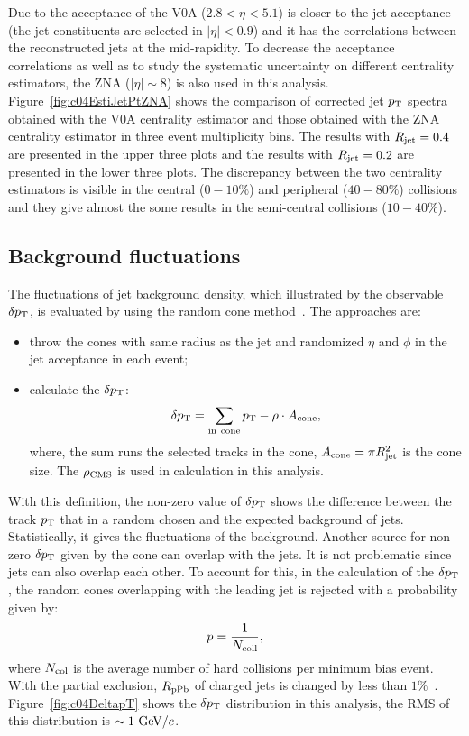 Due to the acceptance of the V0A ($2.8<\eta<5.1$) is closer to the jet
acceptance (the jet constituents are selected in $|\eta|<0.9$) and it has the
correlations between the reconstructed jets at the mid-rapidity.
To decrease the acceptance correlations as well as to study the systematic
uncertainty on different centrality estimators,
the ZNA ($|\eta|\sim 8$) is also used in this analysis.
Figure~\ref{fig:c04EstiJetPtZNA} shows the comparison of corrected
jet $p_{\rm T}$ spectra obtained with the V0A centrality estimator and those obtained
with the ZNA centrality estimator in three event multiplicity bins.
The results with $R_{\rm jet}=0.4$ are presented in the upper three plots and
the results with $R_{\rm jet}=0.2$ are presented in the lower three plots.
The discrepancy between the two centrality estimators is visible in the
central ($0-10\%$) and peripheral ($40-80\%$) collisions and they give almost
the some results in the semi-central collisions ($10-40\%$).

\subsection{Background fluctuations}

The fluctuations of jet background density,
which illustrated by the observable $\delta p_{\rm T}$,
is evaluated by using the random cone method~\cite{Abelev:2012ej}.
The approaches are:
\begin{itemize}
\item throw the cones with same radius as the jet and randomized
      $\eta$ and $\phi$ in the jet acceptance in each event;
\item calculate the $\delta p_{\rm T}$:
      \begin{equation}
      \delta p_{\rm T}=\sum_{\rm in~cone}p_{\rm T}-\rho\cdot A_{\rm cone},
      \end{equation}
      where, the sum runs the selected tracks in the cone,
      $A_{\rm cone}=\pi R_{\rm jet}^{2}$ is the cone size.
      The $\rho_{\rm CMS}$ is used in calculation in this analysis.
\end{itemize}
With this definition, the non-zero value of $\delta p_{\rm T}$ shows the
difference between the track $p_{\rm T}$ that in a random chosen and
the expected background of jets.
Statistically, it gives the fluctuations of the background.
Another source for non-zero $\delta p_{\rm T}$ given by the cone can overlap with
the jets.
It is not problematic since jets can also overlap each other.
To account for this, in the calculation of the $\delta p_{\rm T}$,
the random cones overlapping with the leading jet is rejected with a
probability given by:
\begin{equation}
p=\frac{1}{N_{\rm coll}},
\end{equation}
where $N_{\rm col}$ is the average number of hard collisions per
minimum bias event.
With the partial exclusion, $R_{\rm pPb}$ of charged jets is changed by less
than $1\%$~\cite{Ali2013:ana933}.
Figure~\ref{fig:c04DeltapT} shows the $\delta p_{\rm T}$ distribution
in this analysis,
the RMS of this distribution is $\sim 1~{\rm GeV}/c$.

